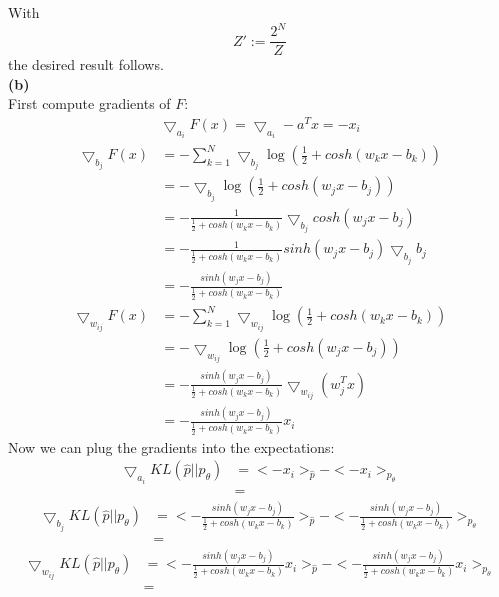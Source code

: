 \documentclass[a4paper]{article}
\newcommand{\1}{\mathds{1}}
\begin{document}
With \[ Z':=\frac{2^N}{Z} \]
the desired result follows.\\
\textbf{(b)}\\
First compute gradients of $F$:
\begin{align*}
\bigtriangledown_{a_i}F(x)=\bigtriangledown_{a_i}-a^Tx=-x_i
\end{align*}
\begin{align*}
\bigtriangledown_{b_j}F(x)&=-\sum_{k=1}^{N}\bigtriangledown_{b_j}\log(\frac{1}{2}+cosh(w_kx-b_k))\\
&=-\bigtriangledown_{b_j}\log(\frac{1}{2}+cosh(w_jx-b_j))\\
&=-\frac{1}{\frac{1}{2}+cosh(w_kx-b_k)}\bigtriangledown_{b_j}cosh(w_jx-b_j)\\
&=-\frac{1}{\frac{1}{2}+cosh(w_kx-b_k)}sinh(w_jx-b_j)\bigtriangledown_{b_j}b_j\\
&=-\frac{sinh(w_jx-b_j)}{\frac{1}{2}+cosh(w_kx-b_k)}
\end{align*}
\begin{align*}
\bigtriangledown_{w_{ij}}F(x)&=-\sum_{k=1}^{N}\bigtriangledown_{w_{ij}}\log(\frac{1}{2}+cosh(w_kx-b_k))\\
&=-\bigtriangledown_{w_{ij}}\log(\frac{1}{2}+cosh(w_jx-b_j))\\
&=-\frac{sinh(w_jx-b_j)}{\frac{1}{2}+cosh(w_kx-b_k)}\bigtriangledown_{w_{ij}}(w_j^Tx)\\
&=-\frac{sinh(w_jx-b_j)}{\frac{1}{2}+cosh(w_kx-b_k)}x_i
\end{align*}
Now we can plug the gradients into the expectations:
\begin{align*}
\bigtriangledown_{a_i}KL(\hat{p}||p_{\theta})&=<-x_i>_{\hat{p}}-<-x_i>_{p_{\theta}}\\
&=
\end{align*}
\begin{align*}
\bigtriangledown_{b_j}KL(\hat{p}||p_{\theta})&=<-\frac{sinh(w_jx-b_j)}{\frac{1}{2}+cosh(w_kx-b_k)}>_{\hat{p}}-<-\frac{sinh(w_jx-b_j)}{\frac{1}{2}+cosh(w_kx-b_k)}>_{p_{\theta}}\\
&=
\end{align*}
\begin{align*}
\bigtriangledown_{w_{ij}}KL(\hat{p}||p_{\theta})&=<-\frac{sinh(w_jx-b_j)}{\frac{1}{2}+cosh(w_kx-b_k)}x_i>_{\hat{p}}-<-\frac{sinh(w_jx-b_j)}{\frac{1}{2}+cosh(w_kx-b_k)}x_i>_{p_{\theta}}\\
&=
\end{align*}
\end{document}
